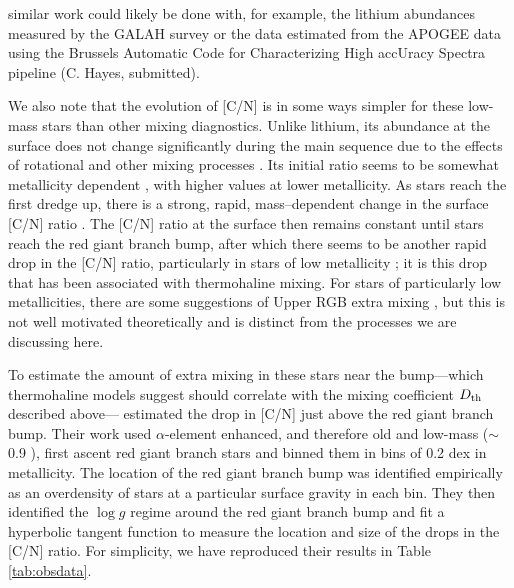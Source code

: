 similar work could likely be done with, for example, the lithium abundances measured by the GALAH survey \citep{buder2019} or the \ctwelvecthirteen data estimated from the APOGEE data using the Brussels Automatic Code for Characterizing High accUracy Spectra \citep[BACCHUS,][]{Masseron2016_BACCHUS} pipeline (C. Hayes, submitted). 



We also note that the evolution of [C/N] is in some ways simpler for these low-mass stars than other mixing diagnostics. Unlike lithium, its abundance at the surface does not change significantly during the main sequence due to the effects of rotational and other mixing processes \citep{Iben1967}. Its initial ratio seems to be somewhat metallicity dependent \citep{Shetrone2019}, with higher values at lower metallicity. As stars reach the first dredge up, there is a strong, rapid, mass--dependent change in the surface [C/N] ratio \citep{MasseronGilmore2015, Martig2016, Ness2016, Spoo2022}. The [C/N] ratio at the surface then remains constant until stars reach the red giant branch bump, after which there seems to be another rapid drop in the [C/N] ratio, particularly in stars of low metallicity \citep[e.g.][]{Gratton2000,Shetrone2019}; it is this drop that has been associated with thermohaline mixing.  For stars of particularly low metallicities, there are some suggestions of Upper RGB extra mixing \citep{Shetrone2019}, but this is not well motivated theoretically and is distinct from the processes we are discussing here.

To estimate the amount of extra mixing in these stars near the bump---which thermohaline models suggest should correlate with the mixing coefficient $D_\mathrm{th}$ described above---\citet{Shetrone2019} estimated the drop in [C/N] just above the red giant branch bump. Their work used $\alpha$-element enhanced, and therefore old and low-mass ($\sim$0.9 \msun), first ascent red giant branch stars and binned them in bins of 0.2 dex in metallicity. The location of the red giant branch bump was identified empirically as an overdensity of stars at a particular surface gravity in each bin. They then identified the $\log g$ regime around the red giant branch bump and fit a hyperbolic tangent function to measure the location and size of the drops in the [C/N] ratio. For simplicity, we have reproduced their results in Table \ref{tab:obsdata}. 



